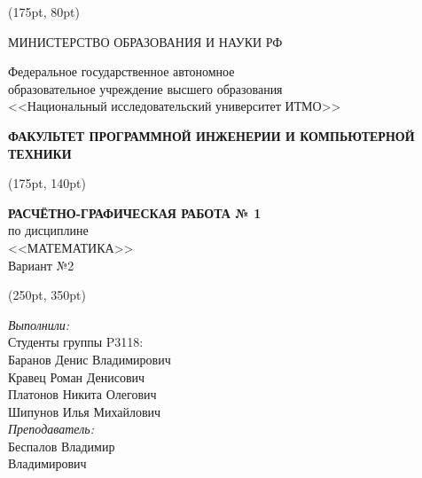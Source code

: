 \documentclass{article}
\begin{document}
\thispagestyle{empty}
\begin{textblock*}{300pt}(175pt, 80pt)
\begin{center} МИНИСТЕРСТВО ОБРАЗОВАНИЯ И НАУКИ РФ \end{center}

\begin{center} Федеральное государственное автономное \\
образовательное учреждение высшего образования \\
<<Национальный исследовательский университет ИТМО>> \end{center}

\begin{center}\textbf {\footnotesize ФАКУЛЬТЕТ ПРОГРАММНОЙ ИНЖЕНЕРИИ И КОМПЬЮТЕРНОЙ ТЕХНИКИ} \end{center} 
\end{textblock*}

\begin{textblock*}{300pt}(175pt, 140pt)
\begin{center}
\vspace{8em}\textbf{РАСЧЁТНО-ГРАФИЧЕСКАЯ РАБОТА № 1} \\
\vspace{1.2em}
по дисциплине \\
<<МАТЕМАТИКА>> \\

\vspace{3em}Вариант №2 \\
\end{center}
\end{textblock*}

\begin{textblock*}{300pt}(250pt, 350pt)
\vspace{17em}\begin{flushright}\textit{Выполнили:} \\
Студенты группы P3118: \\
Баранов Денис Владимирович \\
Кравец Роман Денисович \\
Платонов Никита Олегович \\
Шипунов Илья  Михайлович \\ 
\vspace{1em}
\textit{Преподаватель:} \\
Беспалов Владимир \\ Владимирович \\
\end{flushright}
\end{textblock*}
\end{document}
